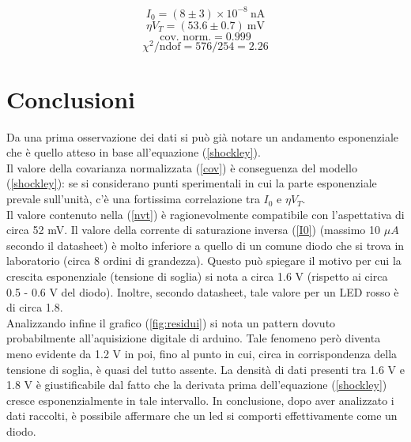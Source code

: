 \documentclass[11pt,a4paper]{article}
\begin{document}
	\begin{equation}
	I_0 = (8 \pm 3)\times 10^{-8} \ \textrm{nA}  
	\label{I0} 
	\end{equation}
	\begin{equation}
	\eta V_T = (53.6 \pm 0.7) \ \textrm{mV} 
	\label{nvt} 
	\end{equation}
	\begin{equation}
	\textrm{cov.\ norm.} = 0.999 
	\label{cov}
	\end{equation}
	\begin{equation}
	\chi^{2}/\textrm{ndof} = 576/254 = 2.26
	\label{chi2}
	\end{equation}
	
\section{Conclusioni}
	Da una prima osservazione dei dati si pu\`{o} gi\`{a} notare un andamento esponenziale che \`{e} quello atteso in base all'equazione (\ref{shockley}).\\
	Il valore della covarianza normalizzata (\ref{cov}) \`{e} conseguenza del modello (\ref{shockley}): se si considerano punti sperimentali in cui la parte esponenziale prevale sull'unit\`{a}, c'\`{e} una fortissima correlazione tra $I_0$ e $\eta V_T$. \\
	Il valore contenuto nella (\ref{nvt}) \`{e} ragionevolmente compatibile con l'aspettativa di circa 52 mV. Il valore della corrente di saturazione inversa (\ref{I0}) (massimo 10 $\mu A$ secondo il datasheet) \`{e} molto inferiore a quello di un comune diodo che si trova in laboratorio (circa 8 ordini di grandezza). Questo pu\`{o} spiegare il motivo per cui la crescita esponenziale (tensione di soglia) si nota a circa 1.6 V (rispetto ai circa 0.5 - 0.6 V del diodo). Inoltre, secondo datasheet, tale valore per un LED rosso \`{e} di circa 1.8. \\
	Analizzando infine il grafico (\ref{fig:residui}) si nota un pattern dovuto probabilmente all'aquisizione digitale di arduino. Tale fenomeno però diventa meno evidente da 1.2 V in poi, fino al punto in cui, circa in corrispondenza della tensione di soglia, \`{e} quasi del tutto assente. La densit\`{a} di dati presenti tra 1.6 V e 1.8 V \`{e} giustificabile dal fatto che la derivata prima dell'equazione (\ref{shockley}) cresce esponenzialmente in tale intervallo.
	In conclusione, dopo aver analizzato i dati raccolti, è possibile affermare che un led si comporti effettivamente come un diodo.
	 
	
\end{document}
